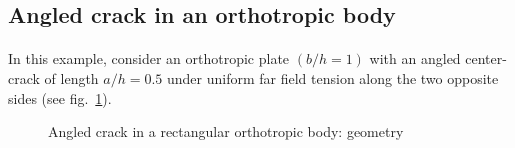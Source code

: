 \subsection{Angled crack in an orthotropic body}

\paragraph{}
In this example, consider an orthotropic plate $(b/h = 1)$ with an angled center-crack of length $a/h = 0.5$ under uniform far field tension along the two opposite sides (see fig.~\ref{iso_fig:angled_crack_geo_bc}). 
    \begin{figure}
        \centering
        \caption{Angled crack in a rectangular orthotropic body: geometry}
        \label{iso_fig:angled_crack_geo_bc}
    \end{figure}

